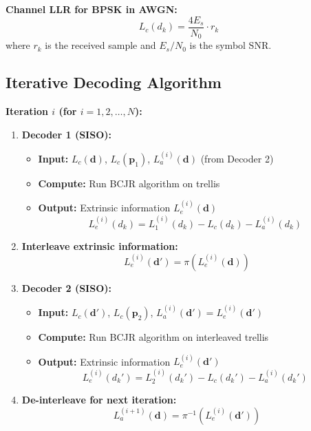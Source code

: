 \textbf{Channel LLR for BPSK in AWGN:}
\begin{equation}
L_c(d_k) = \frac{4 E_s}{N_0} \cdot r_k
\label{eq:channel-llr}
\end{equation}
where $r_k$ is the received sample and $E_s/N_0$ is the symbol SNR.

\subsection{Iterative Decoding Algorithm}

\textbf{Iteration $i$ (for $i = 1, 2, \ldots, N$):}

\begin{enumerate}
\item \textbf{Decoder 1 (SISO):}
  \begin{itemize}
  \item \textbf{Input:} $L_c(\mathbf{d})$, $L_c(\mathbf{p}_1)$, $L_a^{(i)}(\mathbf{d})$ (from Decoder 2)
  \item \textbf{Compute:} Run BCJR algorithm on trellis
  \item \textbf{Output:} Extrinsic information $L_e^{(i)}(\mathbf{d})$
  \begin{equation}
  L_e^{(i)}(d_k) = L_1^{(i)}(d_k) - L_c(d_k) - L_a^{(i)}(d_k)
  \end{equation}
  \end{itemize}

\item \textbf{Interleave extrinsic information:}
  \begin{equation}
  L_e^{(i)}(\mathbf{d}') = \pi(L_e^{(i)}(\mathbf{d}))
  \end{equation}

\item \textbf{Decoder 2 (SISO):}
  \begin{itemize}
  \item \textbf{Input:} $L_c(\mathbf{d}')$, $L_c(\mathbf{p}_2)$, $L_a^{(i)}(\mathbf{d}') = L_e^{(i)}(\mathbf{d}')$
  \item \textbf{Compute:} Run BCJR algorithm on interleaved trellis
  \item \textbf{Output:} Extrinsic information $L_e^{(i)}(\mathbf{d}')$
  \begin{equation}
  L_e^{(i)}(d_k') = L_2^{(i)}(d_k') - L_c(d_k') - L_a^{(i)}(d_k')
  \end{equation}
  \end{itemize}

\item \textbf{De-interleave for next iteration:}
  \begin{equation}
  L_a^{(i+1)}(\mathbf{d}) = \pi^{-1}(L_e^{(i)}(\mathbf{d}'))
  \end{equation}


\end{enumerate}
